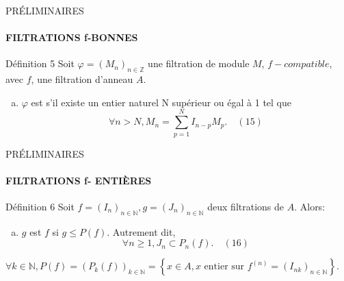 \documentclass[11pt,a4paper]{beamer}
\begin{document}
	\begin{frame}{PRÉLIMINAIRES}
		\framesubtitle{FILTRATIONS f-BONNES}
		\begin{block}{Définition 5}
			Soit $\varphi=(M_n)_{n \in \mathbb{Z}}$ une filtration de module $M$, $f-compatible$, avec $f$, une filtration d'anneau $A$.
			\begin{enumerate}[(a)]
				\item $\varphi$ est  s'il existe un entier naturel N supérieur ou égal à 1 tel que
				\[\forall n > N, M_{n}=\sum_{p=1}^{N}I_{n-p}M_{p}. \quad (15)\]
			\end{enumerate}
		\end{block}
	\end{frame}
	
		\begin{frame}{PRÉLIMINAIRES}
		\framesubtitle{FILTRATIONS f- ENTIÈRES}
		\begin{block}{Définition 6}
			Soit $f=(I_n)_{n \in \mathbb{N}} , g = (J_n)_{n \in \mathbb{N}}$ deux filtrations de $A$.  Alors:\\
			\begin{enumerate}[(b)]
					\item $g$ est  $f$ si $g \leqslant P(f)$. Autrement dit,
				\[\forall n \geqslant 1, J_n \subset P_{n}(f). \quad (16) \]
			\end{enumerate}
			$\forall k \in \mathbb{N}, P(f)=(P_k(f))_{k \in \mathbb{N}} =\left\{x \in A, x \text{ entier sur } f^{(n)} = (I_{nk})_{n \in \mathbb{N}}\right\}.$
		\end{block}
	\end{frame}
	
\end{document}
